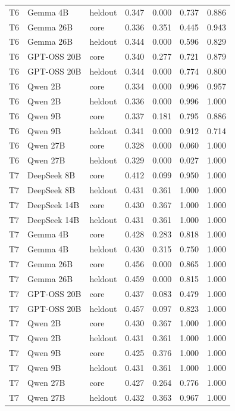 \begin{longtable}{llllrrr}
    T6 & Gemma 4B & heldout & 0.347 & 0.000 & 0.737 & 0.886 \\
    T6 & Gemma 26B & core & 0.336 & 0.351 & 0.445 & 0.943 \\
    T6 & Gemma 26B & heldout & 0.344 & 0.000 & 0.596 & 0.829 \\
    T6 & GPT-OSS 20B & core & 0.340 & 0.277 & 0.721 & 0.879 \\
    T6 & GPT-OSS 20B & heldout & 0.344 & 0.000 & 0.774 & 0.800 \\
    T6 & Qwen 2B & core & 0.334 & 0.000 & 0.996 & 0.957 \\
    T6 & Qwen 2B & heldout & 0.336 & 0.000 & 0.996 & 1.000 \\
    T6 & Qwen 9B & core & 0.337 & 0.181 & 0.795 & 0.886 \\
    T6 & Qwen 9B & heldout & 0.341 & 0.000 & 0.912 & 0.714 \\
    T6 & Qwen 27B & core & 0.328 & 0.000 & 0.060 & 1.000 \\
    T6 & Qwen 27B & heldout & 0.329 & 0.000 & 0.027 & 1.000 \\
    T7 & DeepSeek 8B & core & 0.412 & 0.099 & 0.950 & 1.000 \\
    T7 & DeepSeek 8B & heldout & 0.431 & 0.361 & 1.000 & 1.000 \\
    T7 & DeepSeek 14B & core & 0.430 & 0.367 & 1.000 & 1.000 \\
    T7 & DeepSeek 14B & heldout & 0.431 & 0.361 & 1.000 & 1.000 \\
    T7 & Gemma 4B & core & 0.428 & 0.283 & 0.818 & 1.000 \\
    T7 & Gemma 4B & heldout & 0.430 & 0.315 & 0.750 & 1.000 \\
    T7 & Gemma 26B & core & 0.456 & 0.000 & 0.865 & 1.000 \\
    T7 & Gemma 26B & heldout & 0.459 & 0.000 & 0.815 & 1.000 \\
    T7 & GPT-OSS 20B & core & 0.437 & 0.083 & 0.479 & 1.000 \\
    T7 & GPT-OSS 20B & heldout & 0.457 & 0.097 & 0.823 & 1.000 \\
    T7 & Qwen 2B & core & 0.430 & 0.367 & 1.000 & 1.000 \\
    T7 & Qwen 2B & heldout & 0.431 & 0.361 & 1.000 & 1.000 \\
    T7 & Qwen 9B & core & 0.425 & 0.376 & 1.000 & 1.000 \\
    T7 & Qwen 9B & heldout & 0.431 & 0.361 & 1.000 & 1.000 \\
    T7 & Qwen 27B & core & 0.427 & 0.264 & 0.776 & 1.000 \\
    T7 & Qwen 27B & heldout & 0.432 & 0.363 & 0.967 & 1.000 \\
\bottomrule
\end{longtable}
